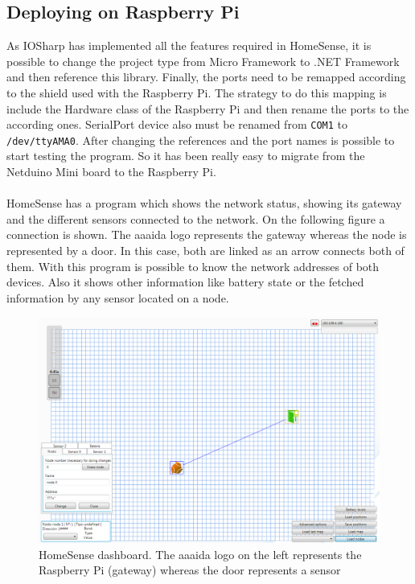 \subsection{Deploying on Raspberry Pi}\label{SS:IOEx-HomeSense-Working}
As IOSharp has implemented all the features required in HomeSense, it is possible to change the project type from Micro Framework to .NET Framework and then reference this library. Finally, the ports need to be remapped according to the shield used with the Raspberry Pi. The strategy to do this mapping is include the Hardware class of the Raspberry Pi and then rename the ports to the according ones. SerialPort device also must be renamed from \verb!COM1! to \verb!/dev/ttyAMA0!. After changing the references and the port names is possible to start testing the program. So it has been really easy to migrate from the Netduino Mini board to the Raspberry Pi.
\\
\\
HomeSense has a program which shows the network status, showing its gateway and the different sensors connected to the network. On the following figure a connection is shown. The aaaida logo represents the gateway whereas the node is represented by a door. In this case, both are linked as an arrow connects both of them. With this program is possible to know the network addresses of both devices. Also it shows other information like battery state or the fetched information by any sensor located on a node.
\begin{figure}[H]\begin{center}
 \centering
  \captionsetup{justification=centering}
  \includegraphics[width=1\textwidth]{pictures/examples/homesense-pillin}
  \caption{HomeSense dashboard. The aaaida logo on the left represents the Raspberry Pi (gateway)  whereas the door represents a sensor\label{fig:IOEx-HS-Dash}}
\end{center}\end{figure}

